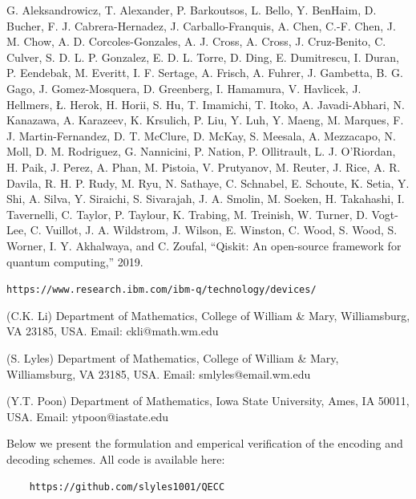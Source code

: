 \documentclass[11pt]{article}
\begin{document}
\begin{thebibliography}{WWW}
  G.  Aleksandrowicz,  T.  Alexander,  P.  Barkoutsos,  L.  Bello,  Y.  BenHaim,  D.  Bucher,  F.  J.  Cabrera-Hernadez,  J.  Carballo-Franquis, A.  Chen,  C.-F.  Chen,  J.  M.  Chow,  A.  D.  Corcoles-Gonzales,  A.  J. Cross,  A.  Cross,  J.  Cruz-Benito,  C.  Culver,  S.  D.  L.  P.  Gonzalez, E.   D.   L.   Torre,   D.   Ding,   E.   Dumitrescu,   I.   Duran,   P.   Eendebak,  M.  Everitt,  I.  F.  Sertage,  A.  Frisch,  A.  Fuhrer,  J.  Gambetta, B.  G.  Gago,  J.  Gomez-Mosquera,  D.  Greenberg,  I.  Hamamura, V.  Havlicek,  J.  Hellmers,  Ł.  Herok,  H.  Horii,  S.  Hu,  T.  Imamichi, T. Itoko, A. Javadi-Abhari, N. Kanazawa, A. Karazeev, K. Krsulich, P. Liu, Y. Luh, Y. Maeng, M. Marques, F. J. Martin-Fernandez, D. T. McClure,  D.  McKay,  S.  Meesala,  A.  Mezzacapo,  N.  Moll,  D.  M. Rodriguez,  G.  Nannicini,  P.  Nation,  P.  Ollitrault,  L.  J.  O’Riordan, H.  Paik,  J.  Perez,  A.  Phan,  M.  Pistoia,  V.  Prutyanov,  M.  Reuter, J. Rice, A. R. Davila, R. H. P. Rudy, M. Ryu, N. Sathaye, C. Schnabel, E. Schoute, K. Setia, Y. Shi, A. Silva, Y. Siraichi, S. Sivarajah, J. A. Smolin, M. Soeken, H. Takahashi, I. Tavernelli, C. Taylor, P. Taylour, K.  Trabing,  M.  Treinish,  W.  Turner,  D.  Vogt-Lee,  C.  Vuillot,  J.  A. Wildstrom, J. Wilson, E. Winston, C. Wood, S. Wood, S. Worner, I. Y. Akhalwaya, and C. Zoufal, “Qiskit: An open-source framework for quantum computing,” 2019.

 \verb|https://www.research.ibm.com/ibm-q/technology/devices/|
 
\end{thebibliography}


\noindent
(C.K. Li) Department of Mathematics, College of William \& Mary,
Williamsburg, VA 23185, USA. Email: ckli@math.wm.edu

\noindent
(S. Lyles) Department of Mathematics, College of William \& Mary,
Williamsburg, VA 23185, USA. Email:
smlyles@email.wm.edu

\noindent
(Y.T. Poon) Department of Mathematics, Iowa State University,
Ames, IA 50011, USA. Email: ytpoon@iastate.edu



\clearpage

\appendix
Below we present the formulation and emperical verification of the encoding and decoding schemes.
All code is available here:
\begin{verbatim}
    https://github.com/slyles1001/QECC
\end{verbatim}
\end{document}
